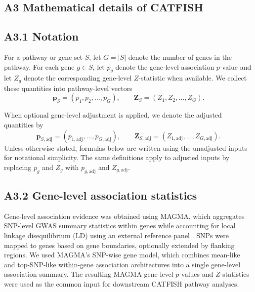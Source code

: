 \documentclass[unnumsec,webpdf,contemporary,large]{oup-authoring-template}%
\theoremstyle{thmstyleone}%
\theoremstyle{thmstyletwo}%
\theoremstyle{thmstylethree}%
\begin{document}
\begin{appendices}



\section{A3 Mathematical details of CATFISH}\label{app:catfish_math}

\subsection{A3.1 Notation}

For a pathway or gene set $S$, let $G=|S|$ denote the number of genes in the pathway. For each gene $g \in S$, let $p_g$ denote the gene-level association $p$-value and let $Z_g$ denote the corresponding gene-level $Z$-statistic when available. We collect these quantities into pathway-level vectors
\[
\mathbf{p}_S = (p_1, p_2, \dots, p_G),
\qquad
\mathbf{Z}_S = (Z_1, Z_2, \dots, Z_G).
\]

When optional gene-level adjustment is applied, we denote the adjusted quantities by
\[
\mathbf{p}_{S,\mathrm{adj}} =
(p_{1,\mathrm{adj}}, \dots, p_{G,\mathrm{adj}}),
\qquad
\mathbf{Z}_{S,\mathrm{adj}} =
(Z_{1,\mathrm{adj}}, \dots, Z_{G,\mathrm{adj}}).
\]
Unless otherwise stated, formulas below are written using the unadjusted inputs for notational simplicity. The same definitions apply to adjusted inputs by replacing $p_g$ and $Z_g$ with $p_{g,\mathrm{adj}}$ and $Z_{g,\mathrm{adj}}$.

\subsection{A3.2 Gene-level association statistics}

Gene-level association evidence was obtained using MAGMA, which aggregates SNP-level GWAS summary statistics within genes while accounting for local linkage disequilibrium (LD) using an external reference panel \citep{deLeeuw2015MAGMA}. SNPs were mapped to genes based on gene boundaries, optionally extended by flanking regions. We used MAGMA's SNP-wise gene model, which combines mean-like and top-SNP-like within-gene association architectures into a single gene-level association summary. The resulting MAGMA gene-level $p$-values and $Z$-statistics were used as the common input for downstream CATFISH pathway analyses.


\end{appendices}
\end{document}
